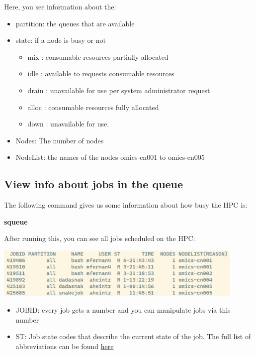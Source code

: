 \documentclass[
  letterpaper,
  DIV=11,
  numbers=noendperiod]{scrreprt}
\newenvironment{Shaded}{}{}
\newcommand{\ExtensionTok}[1]{\textcolor[rgb]{0.84,0.23,0.29}{\textbf{#1}}}
\providecommand{\tightlist}{%
  \setlength{\itemsep}{0pt}\setlength{\parskip}{0pt}}\usepackage{longtable,booktabs,array}
\begin{document}
Here, you see information about the:

\begin{itemize}
\tightlist
\item
  partition: the queues that are available
\item
  state: if a node is busy or not

  \begin{itemize}
  \tightlist
  \item
    mix : consumable resources partially allocated
  \item
    idle : available to requests consumable resources
  \item
    drain : unavailable for use per system administrator request
  \item
    alloc : consumable resources fully allocated
  \item
    down : unavailable for use.
  \end{itemize}
\item
  Nodes: The number of nodes
\item
  NodeList: the names of the nodes omics-cn001 to omics-cn005
\end{itemize}

\subsection{View info about jobs in the
queue}\label{view-info-about-jobs-in-the-queue}

The following command gives us some information about how busy the HPC
is:

\begin{Shaded}
\begin{Highlighting}[]
\ExtensionTok{squeue}
\end{Highlighting}
\end{Shaded}

After running this, you can see all jobs scheduled on the HPC:

\begin{center}
\includegraphics[width=0.9\textwidth,height=\textheight]{../img/squeue.png}
\end{center}

\begin{itemize}
\tightlist
\item
  JOBID: every job gets a number and you can manipulate jobs via this
  number
\item
  ST: Job state codes that describe the current state of the job. The
  full list of abbreviations can be found
  \href{https://curc.readthedocs.io/en/latest/running-jobs/squeue-status-codes.html}{here}
\end{itemize}
\end{document}
